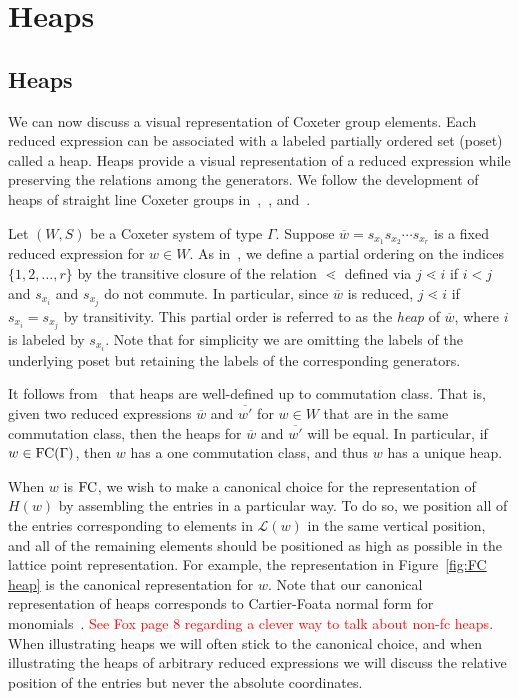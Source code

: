 \chapter{Heaps}

\section{Heaps}\label{sec:Heaps}

We can now discuss a visual representation of Coxeter group elements. Each reduced expression can be associated with a labeled partially ordered set (poset) called a heap.  Heaps provide a visual representation of a reduced expression while preserving the relations among the generators. We follow the development of heaps of straight line Coxeter groups in~\cite{Billey2007},~\cite{Ernst2010}, and~\cite{Stembridge1996}. 

Let $(W,S)$ be a Coxeter system of type $\Gamma$. Suppose $\overline{w}=s_{x_1}s_{x_2}\cdots s_{x_r}$ is a fixed reduced expression for $w \in W$. As in~\cite{Stembridge1996}, we define a partial ordering on the indices $\{1, 2, \ldots, r\}$ by the transitive closure of the relation $\lessdot$ defined via $j \lessdot i$ if $i < j$ and $s_{x_i}$ and $s_{x_j}$ do not commute. In particular, since $\overline{w}$ is reduced, $j \lessdot i$ if $s_{x_i}=s_{x_j}$ by transitivity. This partial order is referred to as the \emph{heap} of $\overline{w}$, where $i$ is labeled by $s_{x_i}$. Note that for simplicity we are omitting the labels of the underlying poset but retaining the labels of the corresponding generators.

It follows from~\cite{Stembridge1996} that heaps are well-defined up to commutation class. That is, given two reduced expressions $\overline{w}$ and $\overline{w'}$ for $w \in W$ that are in the same commutation class, then the heaps for $\overline{w}$ and $\overline{w'}$ will be equal. In particular, if $w \in \mathrm{FC}(\Gamma)$, then $w$ has a one commutation class, and thus $w$ has a unique heap.

When $w$ is $\mathrm{FC}$, we wish to make a canonical choice for the representation of $H(w)$ by assembling the entries in a particular way. To do so, we position all of the entries corresponding to elements in $\mathcal{L}(w)$ in the same vertical position, and all of the remaining elements should be positioned as high as possible in the lattice point representation. For example, the representation in Figure~\ref{fig:FC heap} is the canonical representation for $w$. Note that our canonical representation of heaps corresponds to Cartier-Foata normal form for monomials~\cite{Cartier1969, Green2006a}. \textcolor{red}{See Fox page 8 regarding a clever way to talk about non-fc heaps}. When illustrating heaps we will often stick to the canonical choice, and when illustrating the heaps of arbitrary reduced expressions we will discuss the relative position of the entries but never the absolute coordinates. 

